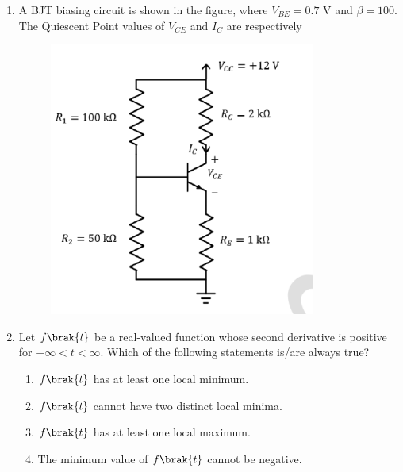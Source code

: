 \documentclass[journal,12pt,onecolumn]{IEEEtran}
\theoremstyle{remark}
\begin{document}
\begin{enumerate}[start=1, label=Q.\arabic*]
     \item A BJT biasing circuit is shown in the figure, where $V_{BE} = 0.7$ V and $\beta = 100$. The Quiescent Point values of $V_{CE}$ and $I_C$ are respectively
    \begin{figure}[H]
        \includegraphics[width=0.5\columnwidth]{Figures/q42.png}
        \centering
        \caption{}
    \end{figure}
    \begin{enumerate}
    \end{enumerate}

    \hfill{}

    \item Let $f\brak{t}$ be a real-valued function whose second derivative is positive for $-\infty < t < \infty$. Which of the following statements is/are always true?
    \begin{enumerate}
        \item $f\brak{t}$ has at least one local minimum.
        \item $f\brak{t}$ cannot have two distinct local minima.
        \item $f\brak{t}$ has at least one local maximum.
        \item The minimum value of $f\brak{t}$ cannot be negative.
    \end{enumerate}
    \hfill{}


\end{enumerate}
\end{document}
